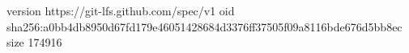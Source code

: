 version https://git-lfs.github.com/spec/v1
oid sha256:a0bb4db8950d67fd179e46051428684d3376ff37505f09a8116bde676d5bb8ec
size 174916
